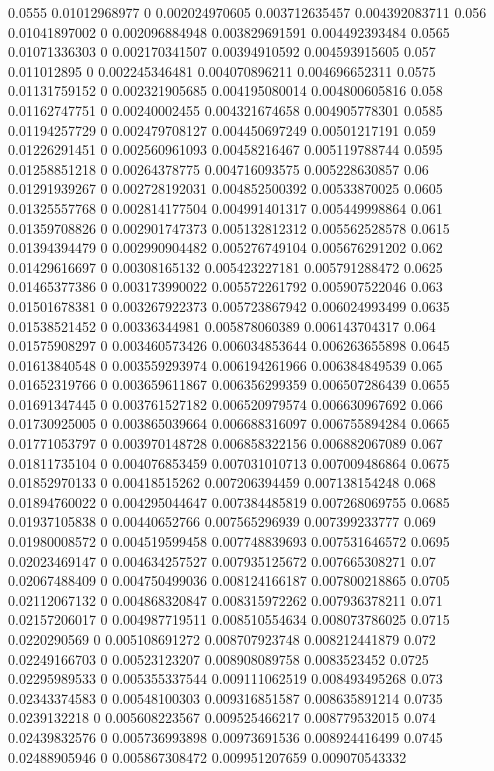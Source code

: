 {0.0555 0.01012968977 0 0.002024970605 0.003712635457 0.004392083711
0.056 0.01041897002 0 0.002096884948 0.003829691591 0.004492393484
0.0565 0.01071336303 0 0.002170341507 0.00394910592 0.004593915605
0.057 0.011012895 0 0.002245346481 0.004070896211 0.004696652311
0.0575 0.01131759152 0 0.002321905685 0.004195080014 0.004800605816
0.058 0.01162747751 0 0.00240002455 0.004321674658 0.004905778301
0.0585 0.01194257729 0 0.002479708127 0.004450697249 0.00501217191
0.059 0.01226291451 0 0.002560961093 0.00458216467 0.005119788744
0.0595 0.01258851218 0 0.00264378775 0.004716093575 0.005228630857
0.06 0.01291939267 0 0.002728192031 0.004852500392 0.00533870025
0.0605 0.01325557768 0 0.002814177504 0.004991401317 0.005449998864
0.061 0.01359708826 0 0.002901747373 0.005132812312 0.005562528578
0.0615 0.01394394479 0 0.002990904482 0.005276749104 0.005676291202
0.062 0.01429616697 0 0.00308165132 0.005423227181 0.005791288472
0.0625 0.01465377386 0 0.003173990022 0.005572261792 0.005907522046
0.063 0.01501678381 0 0.003267922373 0.005723867942 0.006024993499
0.0635 0.01538521452 0 0.00336344981 0.005878060389 0.006143704317
0.064 0.01575908297 0 0.003460573426 0.006034853644 0.006263655898
0.0645 0.01613840548 0 0.003559293974 0.006194261966 0.006384849539
0.065 0.01652319766 0 0.003659611867 0.006356299359 0.006507286439
0.0655 0.01691347445 0 0.003761527182 0.006520979574 0.006630967692
0.066 0.01730925005 0 0.003865039664 0.006688316097 0.006755894284
0.0665 0.01771053797 0 0.003970148728 0.006858322156 0.006882067089
0.067 0.01811735104 0 0.004076853459 0.007031010713 0.007009486864
0.0675 0.01852970133 0 0.00418515262 0.007206394459 0.007138154248
0.068 0.01894760022 0 0.004295044647 0.007384485819 0.007268069755
0.0685 0.01937105838 0 0.00440652766 0.007565296939 0.007399233777
0.069 0.01980008572 0 0.004519599458 0.007748839693 0.007531646572
0.0695 0.02023469147 0 0.004634257527 0.007935125672 0.007665308271
0.07 0.02067488409 0 0.004750499036 0.008124166187 0.007800218865
0.0705 0.02112067132 0 0.004868320847 0.008315972262 0.007936378211
0.071 0.02157206017 0 0.004987719511 0.008510554634 0.008073786025
0.0715 0.0220290569 0 0.005108691272 0.008707923748 0.008212441879
0.072 0.02249166703 0 0.00523123207 0.008908089758 0.0083523452
0.0725 0.02295989533 0 0.005355337544 0.009111062519 0.008493495268
0.073 0.02343374583 0 0.00548100303 0.009316851587 0.008635891214
0.0735 0.0239132218 0 0.005608223567 0.009525466217 0.008779532015
0.074 0.02439832576 0 0.005736993898 0.00973691536 0.008924416499
0.0745 0.02488905946 0 0.005867308472 0.009951207659 0.009070543332
}
